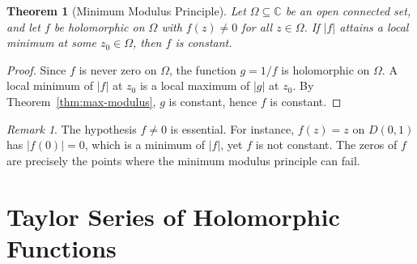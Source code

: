 \documentclass[12pt,a4paper,openany]{book}
\theoremstyle{definition}
\theoremstyle{plain}
\newtheorem{theorem}[definition]{Theorem}
\theoremstyle{remark}
\newtheorem{remark}[definition]{Remark}
\newcommand{\C}{\mathbb{C}}
\newcommand{\abs}[1]{\left|#1\right|}
\begin{document}
\begin{theorem}[Minimum Modulus Principle]\label{thm:min-modulus}
Let $\Omega\subseteq\C$ be an open connected set, and let $f$ be holomorphic on
$\Omega$ with $f(z)\ne 0$ for all $z\in\Omega$. If $\abs{f}$ attains a local
minimum at some $z_0\in\Omega$, then $f$ is constant.
\end{theorem}

\begin{proof}
Since $f$ is never zero on $\Omega$, the function $g=1/f$ is holomorphic on
$\Omega$. A local minimum of $\abs{f}$ at $z_0$ is a local maximum of $\abs{g}$
at $z_0$. By Theorem~\ref{thm:max-modulus}, $g$ is constant, hence $f$ is constant.
\end{proof}

\begin{remark}\label{rem:min-modulus-zero}
The hypothesis $f\ne 0$ is essential. For instance, $f(z)=z$ on $D(0,1)$ has
$\abs{f(0)}=0$, which is a minimum of $\abs{f}$, yet $f$ is not constant. The
zeros of $f$ are precisely the points where the minimum modulus principle can fail.
\end{remark}

\begin{center}
\end{center}

\section{Taylor Series of Holomorphic Functions}
\label{sec:taylor-series}
\end{document}
